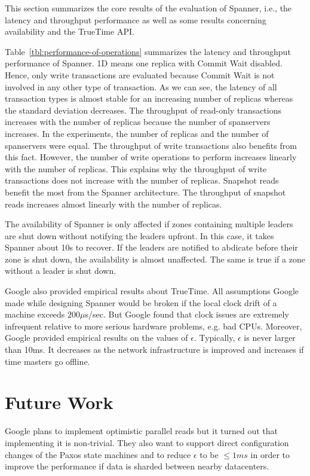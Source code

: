 \documentclass[onecolumn, a4paper, 10pt]{article}
\begin{document}
This section summarizes the core results of the evaluation of Spanner, i.e., the
latency and throughput performance as well as some results concerning availability
and the TrueTime API.

Table~\ref{tbl:performance-of-operations} summarizes the latency and throughput
performance of Spanner. 1D means one replica with Commit Wait disabled. Hence,
only write transactions are evaluated because Commit Wait is not involved in any
other type of transaction. As we can see, the latency of all transaction types is
almost stable for an increasing number of replicas whereas the standard deviation
decreases. The throughput of read-only transactions increases with the number of
replicas because the number of spanservers increases. In the experiments, the
number of replicas and the number of spanservers were equal. The throughput of write
transactions also benefits from this fact. However, the number of write operations
to perform increases linearly with the number of replicas. This explains why the
throughput of write transactions does not increase with the number of replicas.
Snapshot reads benefit the most from the Spanner architecture. The throughput of
snapshot reads increases almost linearly with the number of replicas. 

The availability of Spanner is only affected if zones containing multiple leaders
are shut down without notifying the leaders upfront. In this case, it takes Spanner
about 10s to recover. If the leaders are notified to abdicate before their zone
is shut down, the availability is almost unaffected. The same is true if a zone
without a leader is shut down.

Google also provided empirical results about TrueTime. All assumptions Google
made while designing Spanner would be broken if the local clock drift of a machine
exceeds $200\mu$s/sec. But Google found that clock issues are extremely infrequent
relative to more serious hardware problems, e.g. bad CPUs. Moreover, Google
provided empirical results on the values of $\epsilon$. Typically, $\epsilon$ is
never larger than 10ms. It decreases as the network infrastructure is improved
and increases if time masters go offline.

\section{Future Work}
\label{sec:future-work}

Google plans to implement optimistic parallel reads but it turned out that
implementing it is non-trivial. They also want to support direct configuration
changes of the Paxos state machines and to reduce $\epsilon$ to be $\leq 1ms$ in
order to improve the performance if data is sharded between nearby datacenters.
\end{document}
